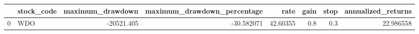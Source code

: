 \begin{tabular}{llrrrrrr}
\toprule
{} & stock\_code &  maximum\_drawdown &  maximum\_drawdown\_percentage &      rate &  gain &  stop &  annualized\_returns \\
\midrule
0 &        WDO &        -20521.405 &                   -30.582071 &  42.60355 &   0.8 &   0.3 &           22.986558 \\
\bottomrule
\end{tabular}
